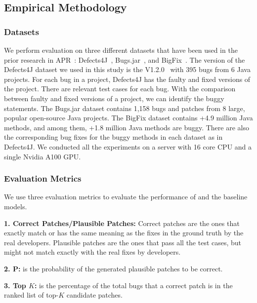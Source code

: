 \subsection{Empirical Methodology}

\subsubsection{Datasets}
We perform evaluation on three different datasets that have been used
in the prior research in APR~\cite{icse20}:
Defects4J~\cite{defects4j}, Bugs.jar~\cite{saha2018bugs}, and
BigFix~\cite{yioopsla19}. The version of the Defects4J dataset we used
in this study is the V1.2.0~\cite{defects4j} with 395 bugs
from 6 Java projects. For each bug in a project, Defects4J has the
faulty and fixed versions of the project. There are relevant test
cases for each bug. With the  comparison between faulty and
fixed versions of a project, we can identify the buggy statements. The
Bugs.jar dataset contains 1,158 bugs and patches from 8 large, popular
open-source Java projects. The BigFix dataset contains +4.9 million
Java methods, and among them, +1.8 million Java methods are
buggy. There are also the corresponding bug fixes for the buggy
methods in each dataset as in Defects4J. We conducted all the
experiments on a server with 16 core CPU and a single Nvidia A100 GPU.

\subsubsection{Evaluation Metrics}

We use three evaluation metrics to evaluate the performance of \tool
and the baseline models.

{\bf 1. Correct Patches/Plausible Patches:} Correct patches are the
ones that exactly match or has the same meaning as the fixes in the
ground truth by the real developers. Plausible patches are the ones
that pass all the test cases, but might not match exactly with the
real fixes by developers.


{\bf 2. P:} is the probability of the generated plausible patches to
be correct.

{\bf 3. Top $K$:} is the percentage of the total bugs that a correct
patch is in the ranked list of top-$K$ candidate patches.

